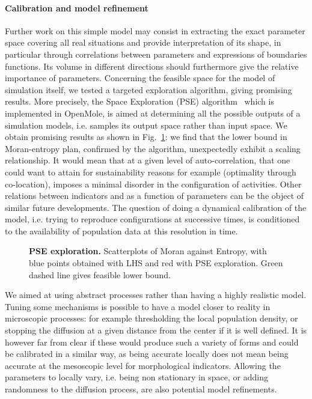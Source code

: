 \documentclass[10pt,letterpaper]{article}
\begin{document}
\paragraph{Calibration and model refinement}

Further work on this simple model may consist in extracting the exact parameter space covering all real situations and provide interpretation of its shape, in particular through correlations between parameters and expressions of boundaries functions. Its volume in different directions should furthermore give the relative importance of parameters. Concerning the feasible space for the model of simulation itself, we tested a targeted exploration algorithm, giving promising results. More precisely, the  Space Exploration (PSE) algorithm~\cite{10.1371/journal.pone.0138212} which is implemented in OpenMole, is aimed at determining all the possible outputs of a simulation models, i.e. samples its output space rather than input space. We obtain promising results as shown in Fig.~\ref{fig:fig6}: we find that the lower bound in Moran-entropy plan, confirmed by the algorithm, unexpectedly exhibit a scaling relationship. It would mean that at a given level of auto-correlation, that one could want to attain for sustainability reasons for example (optimality through co-location), imposes a minimal disorder in the configuration of activities. Other relations between indicators and as a function of parameters can be the object of similar future developments. The question of doing a dynamical calibration of the model, i.e. trying to reproduce configurations at successive times, is conditioned to the availability of population data at this resolution in time.


\begin{figure}
\caption{\textbf{PSE exploration.} Scatterplots of Moran against Entropy, with blue points obtained with LHS and red with PSE exploration. Green dashed line gives feasible lower bound.}
\label{fig:fig6}
\end{figure}


We aimed at using abstract processes rather than having a highly realistic model. Tuning some mechanisms is possible to have a model closer to reality in microscopic processes: for example thresholding the local population density, or stopping the diffusion at a given distance from the center if it is well defined. It is however far from clear if these would produce such a variety of forms and could be calibrated in a similar way, as being accurate locally does not mean being accurate at the mesoscopic level for morphological indicators. Allowing the parameters to locally vary, i.e. being non stationary in space, or adding randomness to the diffusion process, are also potential model refinements.
\end{document}
